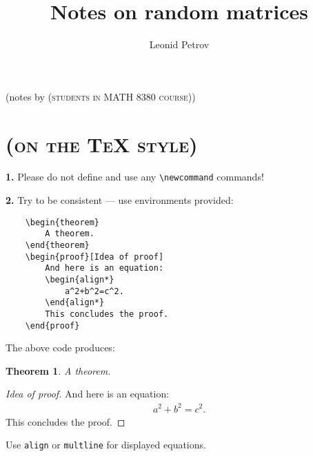 \documentclass[letterpaper,11pt,oneside,reqno]{amsart}
\numberwithin{equation}{section}
\newcommand{\note}[1]{\textsc{\color{blue}(#1)}}
\newtheorem{theorem}[proposition]{Theorem}
\theoremstyle{definition}
\begin{document}
\title[Notes on random matrices]{Notes on random matrices}

\author[L. Petrov]{Leonid Petrov}
\address{L. Petrov, Department of Mathematics, University of Virginia, 
141 Cabell Drive, Kerchof Hall,
P.O. Box 400137,
Charlottesville, VA 22904, USA,
\newline{}and Institute for Information Transmission Problems, Bolshoy Karetny per. 19, Moscow, 127994, Russia}
\date{}
\maketitle

\begin{center}
	(notes by \note{students in MATH 8380 course})
\end{center}

\tableofcontents
\setcounter{tocdepth}{3}

\section*{\note{on the \TeX{} style}}

\lstset{basicstyle=\footnotesize\ttfamily,language=TeX} 

\textbf{1.} Please do not define and use any \lstinline{\newcommand} commands!

\textbf{2.} Try to be consistent --- use environments provided:
\begin{lstlisting}
	\begin{theorem}
		A theorem.		
	\end{theorem}
	\begin{proof}[Idea of proof]
		And here is an equation:
		\begin{align*}
			a^2+b^2=c^2.
		\end{align*}
		This concludes the proof.
	\end{proof}	
\end{lstlisting}
The above code produces:
\begin{theorem}
	A theorem.		
\end{theorem}
\begin{proof}[Idea of proof]
	And here is an equation:
	\begin{align*}
		a^2+b^2=c^2.
	\end{align*}
	This concludes the proof.
\end{proof}
Use \lstinline{align} or \lstinline{multline} for displayed equations.
\end{document}
